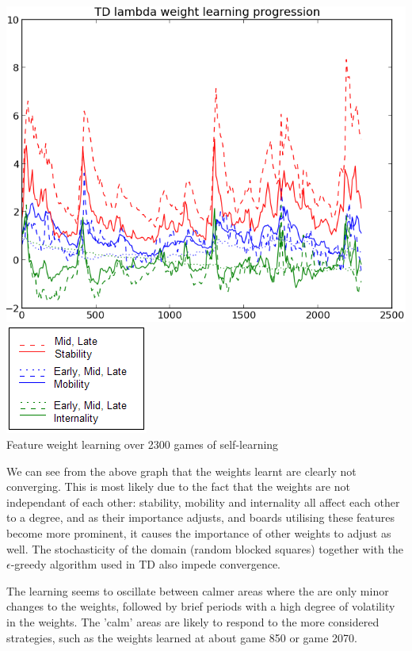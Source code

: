 \documentclass[10pt]{report}
\begin{document}
\begin{multicols}{2}
\begin{center}
\includegraphics[scale=0.40]{longgraph.png}\\
\includegraphics[scale=0.50]{legend.PNG}\\
Feature weight learning over 2300 games of self-learning
\end{center}

We can see from the above graph that the weights learnt are clearly not converging. This is most likely due to the fact that the weights are not independant of each other: stability, mobility and internality all affect each other to a degree, and as their importance adjusts, and boards utilising these features become more prominent, it causes the importance of other weights to adjust as well. The stochasticity of the domain (random blocked squares) together with the $\epsilon$-greedy algorithm used in TD also impede convergence.

The learning seems to oscillate between calmer areas where the are only minor changes to the weights, followed by brief periods with a high degree of volatility in the weights. The 'calm' areas are likely to respond to the more considered strategies, such as the weights learned at about game 850 or game 2070.


\end{multicols}
\end{document}
